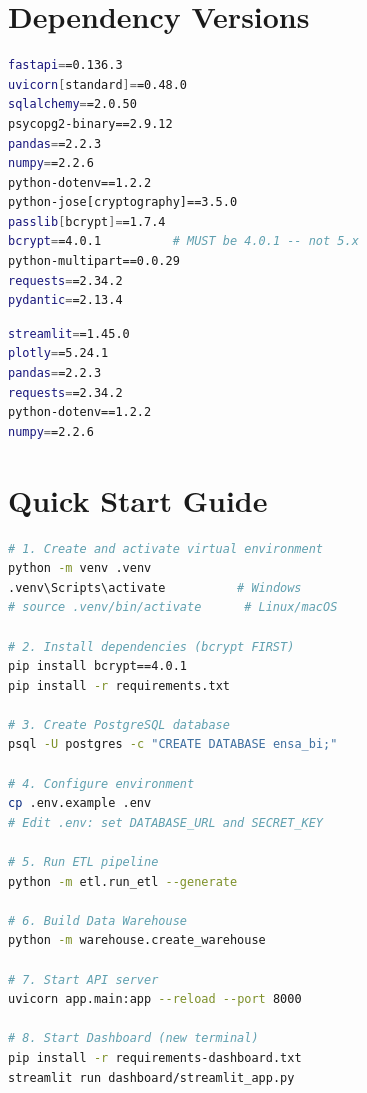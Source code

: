 \documentclass[12pt, a4paper]{report}
\begin{document}
\chapter{Dependency Versions}

\begin{lstlisting}[language=bash, caption={requirements.txt — API \& ETL}]
fastapi==0.136.3
uvicorn[standard]==0.48.0
sqlalchemy==2.0.50
psycopg2-binary==2.9.12
pandas==2.2.3
numpy==2.2.6
python-dotenv==1.2.2
python-jose[cryptography]==3.5.0
passlib[bcrypt]==1.7.4
bcrypt==4.0.1          # MUST be 4.0.1 -- not 5.x
python-multipart==0.0.29
requests==2.34.2
pydantic==2.13.4
\end{lstlisting}

\begin{lstlisting}[language=bash, caption={requirements-dashboard.txt — Streamlit Only}]
streamlit==1.45.0
plotly==5.24.1
pandas==2.2.3
requests==2.34.2
python-dotenv==1.2.2
numpy==2.2.6
\end{lstlisting}

\chapter{Quick Start Guide}

\begin{lstlisting}[language=bash, caption={Complete Local Setup from Scratch}]
# 1. Create and activate virtual environment
python -m venv .venv
.venv\Scripts\activate          # Windows
# source .venv/bin/activate      # Linux/macOS

# 2. Install dependencies (bcrypt FIRST)
pip install bcrypt==4.0.1
pip install -r requirements.txt

# 3. Create PostgreSQL database
psql -U postgres -c "CREATE DATABASE ensa_bi;"

# 4. Configure environment
cp .env.example .env
# Edit .env: set DATABASE_URL and SECRET_KEY

# 5. Run ETL pipeline
python -m etl.run_etl --generate

# 6. Build Data Warehouse
python -m warehouse.create_warehouse

# 7. Start API server
uvicorn app.main:app --reload --port 8000

# 8. Start Dashboard (new terminal)
pip install -r requirements-dashboard.txt
streamlit run dashboard/streamlit_app.py
\end{lstlisting}
\end{document}
